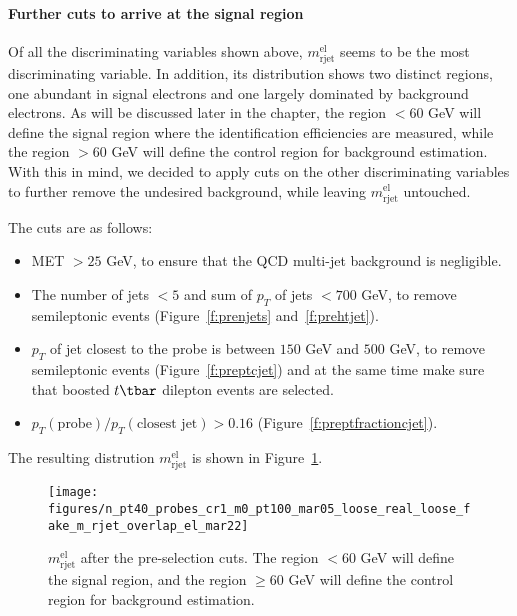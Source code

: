 \paragraph{Further cuts to arrive at the signal region}\label{p:eidfurthercuts}

Of all the discriminating variables shown above, $m_{\text{rjet}}^{\text{el}}$
seems to be the most discriminating variable. In addition, its distribution
shows two distinct regions, one abundant in signal electrons and one largely
dominated by background electrons. As will be discussed later in the chapter,
the region $< 60$ GeV will define the signal region where the identification
efficiencies are measured, while the region $> 60$ GeV will define the control
region for background estimation. With this in mind, we decided to apply cuts
on the other discriminating variables to further remove the undesired
background, while leaving $m_{\text{rjet}}^{\text{el}}$ untouched.

The cuts are as follows:

\begin{itemize}[label=]
	\item MET $> 25$ GeV, to ensure that the QCD multi-jet background is negligible.

	\item The number of jets $< 5$ and sum of $p_T$ of jets $< 700$ GeV, to remove
	      semileptonic events (Figure~\ref{f:prenjets} and~\ref{f:prehtjet}).


	\item $p_T$ of jet closest to the probe is between $150$ GeV and $500$ GeV, to
	      remove semileptonic events (Figure~\ref{f:preptcjet}) and at the
	      same time make sure that boosted $t\tbar$ dilepton events are selected.


	\item $p_T(\text{probe})  / p_T(\text{closest jet}) > 0.16 $ (Figure~\ref{f:preptfractioncjet}).

\end{itemize}

The resulting distrution $m_{\text{rjet}}^{\text{el}}$ is shown in Figure~\ref{f:crmrjet}.

\begin{figure}[H]
	\texttt{[image: figures/n\_pt40\_probes\_cr1\_m0\_pt100\_mar05\_loose\_real\_loose\_fake\_m\_rjet\_overlap\_el\_mar22]}
	\centering

	\caption{$m_{\text{rjet}}^{\text{el}}$ after the pre-selection cuts. The
		region $< 60$ GeV will define the signal region, and the region $\geq 60$ GeV
		will define the control region for background estimation.}

	\label{f:crmrjet}
\end{figure}

